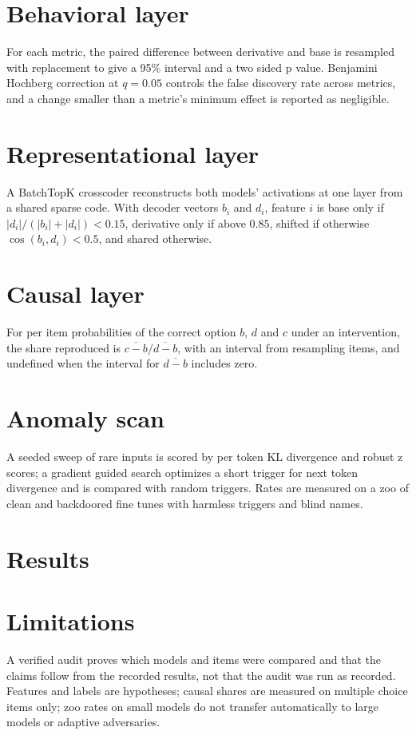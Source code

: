 \documentclass[11pt]{article}
\begin{document}
\section{Behavioral layer}
For each metric, the paired difference between derivative and base is resampled with replacement to give a 95\% interval and a two sided p value. Benjamini Hochberg correction at $q=0.05$ controls the false discovery rate across metrics, and a change smaller than a metric's minimum effect is reported as negligible.

\section{Representational layer}
A BatchTopK crosscoder \citep{bussmann2024batchtopk} reconstructs both models' activations at one layer from a shared sparse code. With decoder vectors $b_i$ and $d_i$, feature $i$ is base only if $|d_i|/(|b_i|+|d_i|) < 0.15$, derivative only if above $0.85$, shifted if otherwise $\cos(b_i,d_i) < 0.5$, and shared otherwise.

\section{Causal layer}
For per item probabilities of the correct option $b$, $d$ and $c$ under an intervention, the share reproduced is $\overline{c-b}/\overline{d-b}$, with an interval from resampling items, and undefined when the interval for $\overline{d-b}$ includes zero.

\section{Anomaly scan}
A seeded sweep of rare inputs is scored by per token KL divergence and robust z scores; a gradient guided search optimizes a short trigger for next token divergence and is compared with random triggers. Rates are measured on a zoo of clean and backdoored fine tunes with harmless triggers and blind names.

\section{Results}

\section{Limitations}
A verified audit proves which models and items were compared and that the claims follow from the recorded results, not that the audit was run as recorded. Features and labels are hypotheses; causal shares are measured on multiple choice items only; zoo rates on small models do not transfer automatically to large models or adaptive adversaries.



\end{document}
